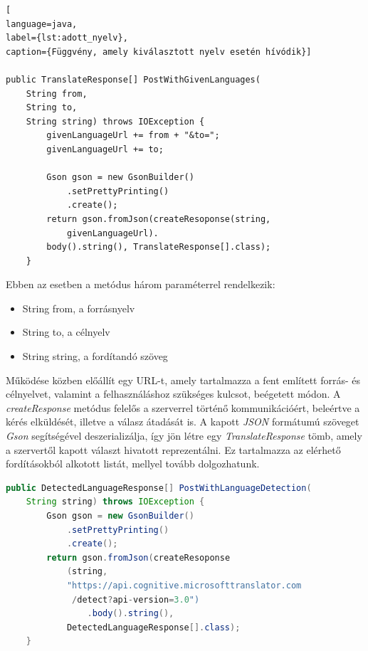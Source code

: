 \begin{spacing}{1.25}
\begin{lstlisting}[
language=java, 
label={lst:adott_nyelv},
caption={Függvény, amely kiválasztott nyelv esetén hívódik}]

public TranslateResponse[] PostWithGivenLanguages(
    String from,
    String to,
    String string) throws IOException {
        givenLanguageUrl += from + "&to=";
        givenLanguageUrl += to;

        Gson gson = new GsonBuilder()
            .setPrettyPrinting()
            .create();
        return gson.fromJson(createResoponse(string,
            givenLanguageUrl).
        body().string(), TranslateResponse[].class);
    }
\end{lstlisting}
\end{spacing}

Ebben az esetben a metódus három paraméterrel rendelkezik:
\begin{itemize}[noitemsep]
\item String from, a forrásnyelv
\item String to, a célnyelv
\item String string, a fordítandó szöveg
\end{itemize}
Működése közben előállít egy URL-t, amely tartalmazza a fent említett forrás- és célnyelvet, valamint a felhasználáshoz szükséges kulcsot, beégetett módon. A \textit{createResponse} metódus felelős a szerverrel történő kommunikációért, beleértve a kérés elküldését, illetve a válasz átadását is. A kapott \textit{JSON} formátumú szöveget \textit{Gson} segítségével deszerializálja, így jön létre egy \textit{TranslateResponse} tömb, amely a szervertől kapott választ hivatott reprezentálni. Ez tartalmazza az elérhető fordításokból alkotott listát, mellyel tovább dolgozhatunk.

\begin{spacing}{1.25}
\begin{lstlisting}[language=java, label={lst:felismert_nyelv}, caption={Függvény, amely detektált nyelv esetén hívódik}, showstringspaces=false]
public DetectedLanguageResponse[] PostWithLanguageDetection(
    String string) throws IOException {
        Gson gson = new GsonBuilder()
            .setPrettyPrinting()
            .create();
        return gson.fromJson(createResoponse
            (string,
            "https://api.cognitive.microsofttranslator.com
             /detect?api-version=3.0")
                .body().string(),
            DetectedLanguageResponse[].class);
    }
\end{lstlisting}
\end{spacing}

